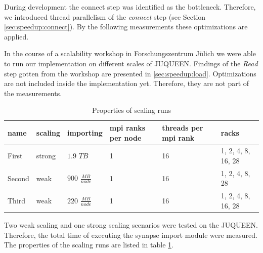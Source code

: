 During development the connect step was identified as the bottleneck.
Therefore, we introduced thread parallelism of the \emph{connect} step (see Section \ref{sec:speedup:connect}).
By the following measurements these optimizations are applied.

In the course of a scalability workshop in Forschungszentrum J\"{u}lich we were able to run
our implementation on different scales of JUQUEEN.
Findings of the \emph{Read} step gotten from the workshop are presented in \ref{sec:speedup:load}.
Optimizations are not included inside the implementation yet.
Therefore, they are not part of the measurements.
\begin{table}[ht!]
\begin{center}
\begin{tabular}{|l|l|l|p{1.9cm}|p{2.1cm}|l|}
\hline
name & scaling & importing & mpi ranks per node & threads per mpi rank & racks \\
\hline\hline
First    &  strong  & $1.9$ $TB$             & 1 & 16 & 1, 2, 4, 8, 16, 28 \\
Second    &  weak  & $900$ $\frac{MB}{node}$      & 1 & 16 & 1, 2, 4, 8, 28 \\
Third    &  weak  & $220$ $\frac{MB}{node}$     & 1 & 16 & 1, 2, 4, 8, 16, 28 \\
\hline
\end{tabular}
\end{center}
\caption{Properties of scaling runs}
\label{schumann:tbl:runs}
\end{table}

Two weak scaling and one strong scaling scenarios were tested on the JUQUEEN.
Therefore, the total time of executing the synapse import module were measured.
The properties of the scaling runs are listed in table \ref{schumann:tbl:runs}.

